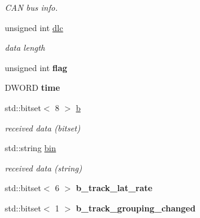 \begin{DoxyCompactItemize}
\begin{DoxyCompactList}\small\item\em C\+A\+N bus info. \end{DoxyCompactList}\item 
\hypertarget{class_radar_controller_af173d0ba04e4ad7c5c74d816b532a0ba}{}unsigned int \hyperlink{class_radar_controller_af173d0ba04e4ad7c5c74d816b532a0ba}{dlc}\label{class_radar_controller_af173d0ba04e4ad7c5c74d816b532a0ba}

\begin{DoxyCompactList}\small\item\em data length \end{DoxyCompactList}\item 
\hypertarget{class_radar_controller_abe6507d861c6ed74ac93cc690e74e625}{}unsigned int {\bfseries flag}\label{class_radar_controller_abe6507d861c6ed74ac93cc690e74e625}

\item 
\hypertarget{class_radar_controller_a235c86b043b96f8fed1e322d3041e8cd}{}D\+W\+O\+R\+D {\bfseries time}\label{class_radar_controller_a235c86b043b96f8fed1e322d3041e8cd}

\item 
\hypertarget{class_radar_controller_abd1f97e3345954539ed9f2d64fa2ea8a}{}std\+::bitset$<$ 8 $>$ \hyperlink{class_radar_controller_abd1f97e3345954539ed9f2d64fa2ea8a}{b}\label{class_radar_controller_abd1f97e3345954539ed9f2d64fa2ea8a}

\begin{DoxyCompactList}\small\item\em received data (bitset) \end{DoxyCompactList}\item 
\hypertarget{class_radar_controller_ac1faf27510539e961f7a6ff465049ea1}{}std\+::string \hyperlink{class_radar_controller_ac1faf27510539e961f7a6ff465049ea1}{bin}\label{class_radar_controller_ac1faf27510539e961f7a6ff465049ea1}

\begin{DoxyCompactList}\small\item\em received data (string) \end{DoxyCompactList}\item 
\hypertarget{class_radar_controller_ae8d2b8b7295f25282b733817fcdd242c}{}std\+::bitset$<$ 6 $>$ {\bfseries b\+\_\+track\+\_\+lat\+\_\+rate}\label{class_radar_controller_ae8d2b8b7295f25282b733817fcdd242c}

\item 
\hypertarget{class_radar_controller_a526dfd9a787864f60c4c7d8c9eae078b}{}std\+::bitset$<$ 1 $>$ {\bfseries b\+\_\+track\+\_\+grouping\+\_\+changed}\label{class_radar_controller_a526dfd9a787864f60c4c7d8c9eae078b}


\end{DoxyCompactItemize}
